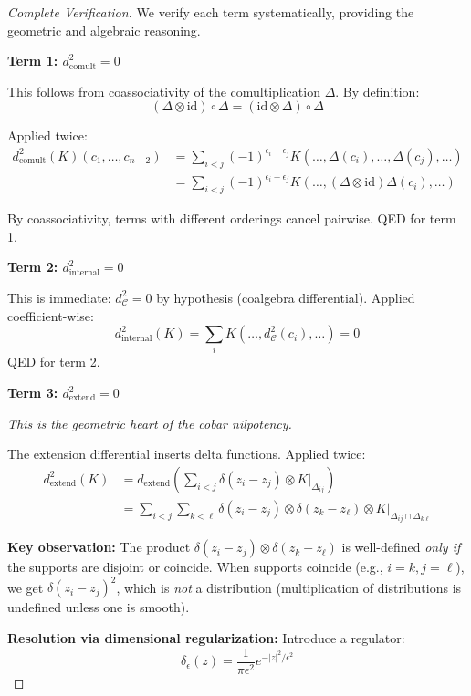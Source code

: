 \begin{proof}[Complete Verification]
We verify each term systematically, providing the geometric and algebraic reasoning.

\textbf{Term 1: $d_{\text{comult}}^2 = 0$}

This follows from coassociativity of the comultiplication $\Delta$. By definition:
$$(\Delta \otimes \text{id}) \circ \Delta = (\text{id} \otimes \Delta) \circ \Delta$$

Applied twice:
\begin{align*}
d_{\text{comult}}^2(K)(c_1, \ldots, c_{n-2}) &= \sum_{i < j} (-1)^{\epsilon_i + 
\epsilon_j} K(\ldots, \Delta(c_i), \ldots, \Delta(c_j), \ldots) \\
&= \sum_{i < j} (-1)^{\epsilon_i + \epsilon_j} K(\ldots, (\Delta \otimes \text{id})
\Delta(c_i), \ldots)
\end{align*}

By coassociativity, terms with different orderings cancel pairwise. QED for term 1.

\textbf{Term 2: $d_{\text{internal}}^2 = 0$}

This is immediate: $d_{\mathcal{C}}^2 = 0$ by hypothesis (coalgebra differential). 
Applied coefficient-wise:
$$d_{\text{internal}}^2(K) = \sum_i K(\ldots, d_{\mathcal{C}}^2(c_i), \ldots) = 0$$
QED for term 2.

\textbf{Term 3: $d_{\text{extend}}^2 = 0$}

\emph{This is the geometric heart of the cobar nilpotency.}

The extension differential inserts delta functions. Applied twice:
\begin{align*}
d_{\text{extend}}^2(K) &= d_{\text{extend}}\left(\sum_{i<j} \delta(z_i - z_j) \otimes 
K|_{\Delta_{ij}}\right) \\
&= \sum_{i<j} \sum_{k<\ell} \delta(z_i - z_j) \otimes \delta(z_k - z_\ell) \otimes 
K|_{\Delta_{ij} \cap \Delta_{k\ell}}
\end{align*}

\textbf{Key observation:} The product $\delta(z_i - z_j) \otimes \delta(z_k - z_\ell)$ 
is well-defined \emph{only if} the supports are disjoint or coincide. When supports 
coincide (e.g., $i=k, j=\ell$), we get $\delta(z_i - z_j)^2$, which is \emph{not} 
a distribution (multiplication of distributions is undefined unless one is smooth).

\textbf{Resolution via dimensional regularization:} Introduce a regulator:
$$\delta_\epsilon(z) = \frac{1}{\pi \epsilon^2} e^{-|z|^2/\epsilon^2}$$


\end{proof}
